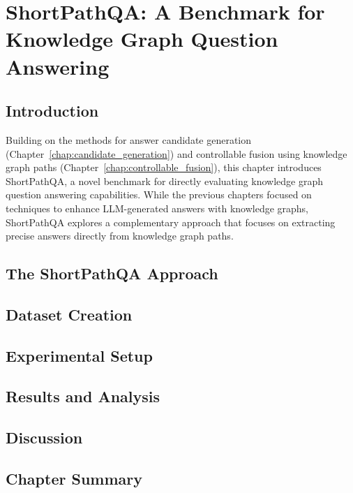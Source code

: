\chapter{ShortPathQA: A Benchmark for Knowledge Graph Question Answering}
\label{chap:shortpathqa}

\section{Introduction}
\label{sec:shortpath:intro}
Building on the methods for answer candidate generation (Chapter~\ref{chap:candidate_generation}) and controllable fusion using knowledge graph paths (Chapter~\ref{chap:controllable_fusion}), this chapter introduces ShortPathQA, a novel benchmark for directly evaluating knowledge graph question answering capabilities. While the previous chapters focused on techniques to enhance LLM-generated answers with knowledge graphs, ShortPathQA explores a complementary approach that focuses on extracting precise answers directly from knowledge graph paths.

\section{The ShortPathQA Approach}
\label{sec:shortpath:method}

\section{Dataset Creation}
\label{sec:shortpath:dataset}

\section{Experimental Setup}
\label{sec:shortpath:setup}

\section{Results and Analysis}
\label{sec:shortpath:results}

\section{Discussion}
\label{sec:shortpath:discussion}

\section{Chapter Summary}
\label{sec:shortpath:summary}
